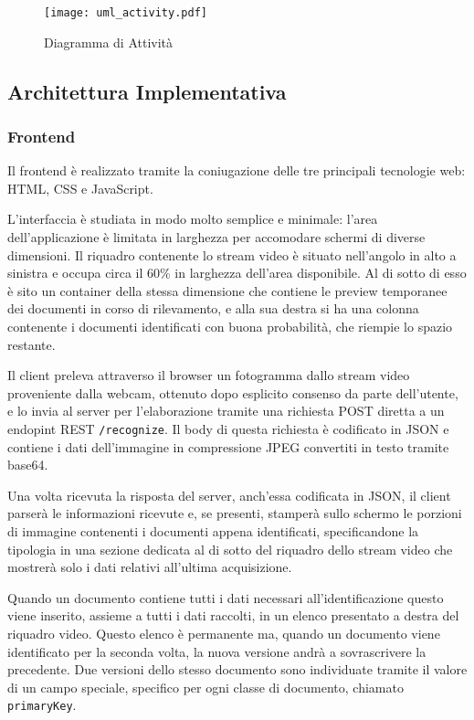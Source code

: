 \documentclass[12pt,a4paper]{article}
\begin{document}
\begin{figure}[H]
    \caption{Diagramma di Attività}
    \centering
    \texttt{[image: uml\_activity.pdf]}
\end{figure}

\subsection{Architettura Implementativa}

\subsubsection{Frontend}

Il frontend è realizzato tramite la coniugazione delle tre principali
tecnologie web: HTML, CSS e JavaScript.

L'interfaccia è studiata in modo molto semplice e minimale: l'area
dell'applicazione è limitata in larghezza per accomodare schermi di
diverse dimensioni. Il riquadro contenente lo stream video è
situato nell'angolo in alto a sinistra e occupa circa il 60\% in
larghezza dell'area disponibile. Al di sotto di esso è sito un container
della stessa dimensione che contiene le preview temporanee dei documenti
in corso di rilevamento, e alla sua destra si ha una colonna contenente
i documenti identificati con buona probabilità, che riempie lo spazio
restante.

Il client preleva attraverso il browser un fotogramma dallo stream video
proveniente dalla webcam, ottenuto dopo esplicito consenso da parte
dell'utente, e lo invia al server per l'elaborazione tramite una
richiesta POST diretta a un endopint REST \texttt{/recognize}. Il body
di questa richiesta è codificato in JSON e contiene i dati dell'immagine
in compressione JPEG convertiti in testo tramite base64.

Una volta ricevuta la risposta del server, anch'essa codificata in JSON,
il client parserà le informazioni ricevute e, se presenti, stamperà
sullo schermo le porzioni di immagine contenenti i documenti appena
identificati, specificandone la tipologia in una sezione dedicata al di
sotto del riquadro dello stream video che mostrerà solo i dati relativi
all'ultima acquisizione.

Quando un documento contiene tutti i dati necessari all'identificazione
questo viene inserito, assieme a tutti i dati raccolti, in un elenco
presentato a destra del riquadro video. Questo elenco è permanente ma,
quando un documento viene identificato per la seconda volta, la nuova
versione andrà a sovrascrivere la precedente. Due versioni dello stesso
documento sono individuate tramite il valore di un campo speciale,
specifico per ogni classe di documento, chiamato \texttt{primaryKey}.
\end{document}
